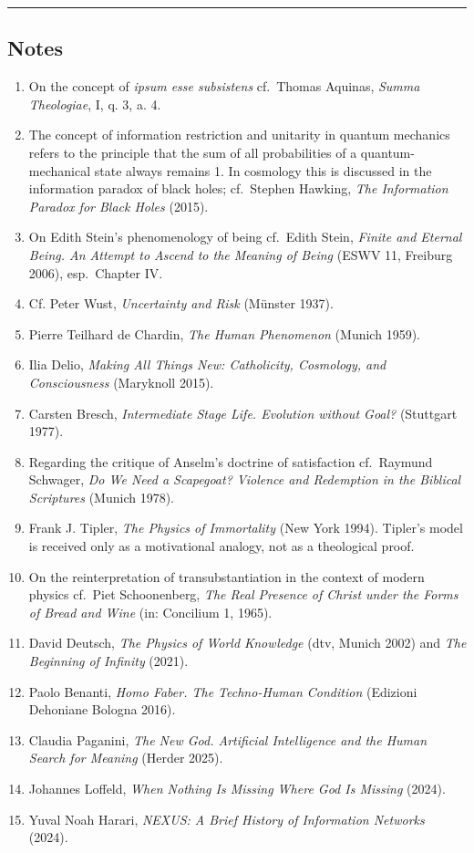 \documentclass[
  english,
]{article}
\begin{document}
\begin{center}\rule{0.5\linewidth}{0.5pt}\end{center}

\subsection{Notes}\label{notes}

\begin{enumerate}
\def\labelenumi{\arabic{enumi}.}
\item
  On the concept of \emph{ipsum esse subsistens} cf.~Thomas Aquinas,
  \emph{Summa Theologiae}, I, q. 3, a. 4.
\item
  The concept of information restriction and unitarity in quantum
  mechanics refers to the principle that the sum of all probabilities of
  a quantum-mechanical state always remains 1. In cosmology this is
  discussed in the information paradox of black holes; cf.~Stephen
  Hawking, \emph{The Information Paradox for Black Holes} (2015).
\item
  On Edith Stein's phenomenology of being cf.~Edith Stein, \emph{Finite
  and Eternal Being. An Attempt to Ascend to the Meaning of Being} (ESWV
  11, Freiburg 2006), esp.~Chapter IV.
\item
  Cf. Peter Wust, \emph{Uncertainty and Risk} (Münster 1937).
\item
  Pierre Teilhard de Chardin, \emph{The Human Phenomenon} (Munich 1959).
\item
  Ilia Delio, \emph{Making All Things New: Catholicity, Cosmology, and
  Consciousness} (Maryknoll 2015).
\item
  Carsten Bresch, \emph{Intermediate Stage Life. Evolution without
  Goal?} (Stuttgart 1977).
\item
  Regarding the critique of Anselm's doctrine of satisfaction
  cf.~Raymund Schwager, \emph{Do We Need a Scapegoat? Violence and
  Redemption in the Biblical Scriptures} (Munich 1978).
\item
  Frank J. Tipler, \emph{The Physics of Immortality} (New York 1994).
  Tipler's model is received only as a motivational analogy, not as a
  theological proof.
\item
  On the reinterpretation of transubstantiation in the context of modern
  physics cf.~Piet Schoonenberg, \emph{The Real Presence of Christ under
  the Forms of Bread and Wine} (in: Concilium 1, 1965).
\item
  David Deutsch, \emph{The Physics of World Knowledge} (dtv, Munich
  2002) and \emph{The Beginning of Infinity} (2021).
\item
  Paolo Benanti, \emph{Homo Faber. The Techno-Human Condition} (Edizioni
  Dehoniane Bologna 2016).
\item
  Claudia Paganini, \emph{The New God. Artificial Intelligence and the
  Human Search for Meaning} (Herder 2025).
\item
  Johannes Loffeld, \emph{When Nothing Is Missing Where God Is Missing}
  (2024).
\item
  Yuval Noah Harari, \emph{NEXUS: A Brief History of Information
  Networks} (2024).
\end{enumerate}
\end{document}
